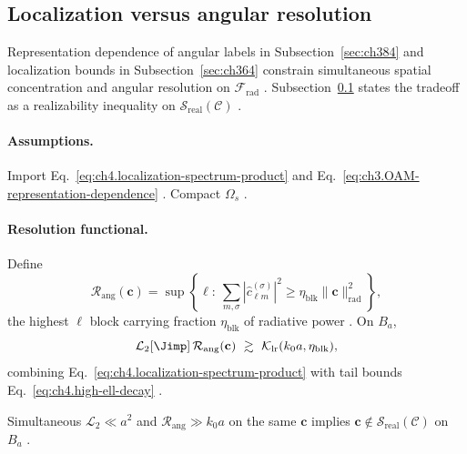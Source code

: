 \subsection{Localization versus angular resolution}
\label{sec:ch474}

Representation dependence of angular labels in Subsection~\ref{sec:ch384} and localization bounds in
Subsection~\ref{sec:ch364} constrain simultaneous spatial concentration and angular resolution on \(\mathcal{F}_{\mathrm{rad}}\)
\cite{harrington2001,hansen1988,stratton1941}. Subsection~\ref{sec:ch474} states the tradeoff as a realizability inequality on
\(\mathcal{S}_{\mathrm{real}}(\mathcal{C})\) \cite{devaney2004}.

\paragraph{Assumptions.}
Import Eq.~\eqref{eq:ch4.localization-spectrum-product} and Eq.~\eqref{eq:ch3.OAM-representation-dependence}
\cite{stratton1941,hansen1988,harrington2001}. Compact \(\Omega_{s}\) \cite{jackson1999}.

\paragraph{Resolution functional.}
Define
\begin{equation}
\label{eq:ch4.angular-resolution-functional}
\mathcal{R}_{\mathrm{ang}}(\mathbf{c})
=
\sup\left\{
\ell:\ \sum_{m,\sigma}|\widehat{c}_{\ell m}^{(\sigma)}|^{2}
\ge
\eta_{\mathrm{blk}}\|\mathbf{c}\|_{\mathrm{rad}}^{2}
\right\},
\end{equation}
the highest \(\ell\) block carrying fraction \(\eta_{\mathrm{blk}}\) of radiative power \cite{hansen1988,stratton1941}. On \(B_{a}\),
\begin{equation}
\label{eq:ch4.localization-resolution-tradeoff}
\mathcal{L}_{2}[\Jimp]\,\mathcal{R}_{\mathrm{ang}}(\mathbf{c})
\ \gtrsim\
\mathcal{K}_{\mathrm{lr}}(k_{0}a,\eta_{\mathrm{blk}}),
\end{equation}
combining Eq.~\eqref{eq:ch4.localization-spectrum-product} with tail bounds Eq.~\eqref{eq:ch4.high-ell-decay}
\cite{jackson1999,hansen1988,devaney2004}.

\begin{corollary}
\label{cor:ch4.super-resolution-obstruction}
Simultaneous \(\mathcal{L}_{2}\ll a^{2}\) and \(\mathcal{R}_{\mathrm{ang}}\gg k_{0}a\) on the same \(\mathbf{c}\) implies
\(\mathbf{c}\notin\mathcal{S}_{\mathrm{real}}(\mathcal{C})\) on \(B_{a}\) \cite{hansen1988,stratton1941,devaney2004}.
\end{corollary}

